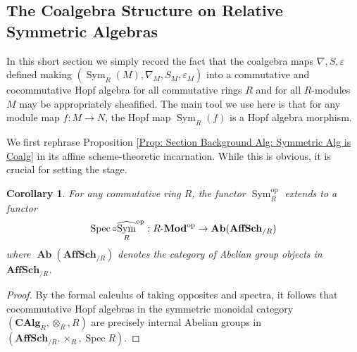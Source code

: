 \documentclass{amsart}
\newtheorem{corollary}[equation]{Corollary}
\theoremstyle{definition}
\DeclareMathOperator{\sym}{Sym}
\DeclareMathOperator{\Ab}{\mathbf{Ab}}
\DeclareMathOperator{\op}{op}
\DeclareMathOperator{\Spec}{Spec}
\newcommand{\CAlg}[1]{\mathbf{CAlg}_{#1}}
\newcommand{\Sym}[1]{\sym_{#1}}
\let\epsilon\varepsilon
\let\epsilon\varepsilon
\newcommand{\Mod}[1]{{#1}\textnormal{-}\mathbf{Mod}}
\numberwithin{equation}{subsection}
\begin{document}
\subsection{The Coalgebra Structure on Relative Symmetric Algebras}\label{Subsection: Coalgebra structure on Relative Sym}

In this short section we simply record the fact that the coalgebra maps $\nabla, S, \epsilon$ defined making $(\Sym{R}(M),\nabla_M,S_M,\epsilon_M)$ into a commutative and cocommutative Hopf algebra for all commutative rings $R$ and for all $R$-modules $M$ may be appropriately sheafified. The main tool we use here is that for any module map $f:M \to N$, the Hopf map $\Sym{R}(f)$ is a Hopf algebra morphism.

We first rephrase Proposition \ref{Prop: Section Background Alg: Symmetric Alg is Coalg} in its affine scheme-theoretic incarnation. While this is obvious, it is crucial for setting the stage.

\begin{corollary}\label{Cor: Section Background Alg: Sym as a functor into CMon of CAlg op}
	For any commutative ring $R$, the functor $\Sym{R}^{\op}$ extends to a functor
	\[
	\Spec\circ \widehat{\Sym{R}}^{\op}:\Mod{R}^{\op} \to \mathbf{Ab}(\mathbf{AffSch}_{/R})
	\]
	where $\Ab(\mathbf{AffSch}_{/R})$ denotes the category of Abelian group objects in $\mathbf{AffSch}_{/R}$.
\end{corollary}
\begin{proof}
	By the formal calculus of taking opposites and spectra, it follows that cocommutative Hopf algebras in the symmetric monoidal category $(\CAlg{R},\otimes_R,R)$ are precisely internal Abelian groups in $(\mathbf{AffSch}_{/R},\times_R, \Spec R)$.
\end{proof}
\end{document}

